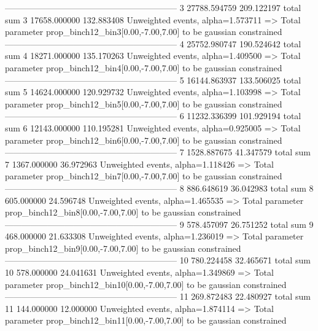 ------------------------------------------------------------
3          27788.594759    209.122197      total sum                     
3          17658.000000    132.883408      Unweighted events, alpha=1.573711
  => Total parameter prop_binch12_bin3[0.00,-7.00,7.00] to be gaussian constrained
------------------------------------------------------------
4          25752.980747    190.524642      total sum                     
4          18271.000000    135.170263      Unweighted events, alpha=1.409500
  => Total parameter prop_binch12_bin4[0.00,-7.00,7.00] to be gaussian constrained
------------------------------------------------------------
5          16144.863937    133.506025      total sum                     
5          14624.000000    120.929732      Unweighted events, alpha=1.103998
  => Total parameter prop_binch12_bin5[0.00,-7.00,7.00] to be gaussian constrained
------------------------------------------------------------
6          11232.336399    101.929194      total sum                     
6          12143.000000    110.195281      Unweighted events, alpha=0.925005
  => Total parameter prop_binch12_bin6[0.00,-7.00,7.00] to be gaussian constrained
------------------------------------------------------------
7          1528.887675     41.347579       total sum                     
7          1367.000000     36.972963       Unweighted events, alpha=1.118426
  => Total parameter prop_binch12_bin7[0.00,-7.00,7.00] to be gaussian constrained
------------------------------------------------------------
8          886.648619      36.042983       total sum                     
8          605.000000      24.596748       Unweighted events, alpha=1.465535
  => Total parameter prop_binch12_bin8[0.00,-7.00,7.00] to be gaussian constrained
------------------------------------------------------------
9          578.457097      26.751252       total sum                     
9          468.000000      21.633308       Unweighted events, alpha=1.236019
  => Total parameter prop_binch12_bin9[0.00,-7.00,7.00] to be gaussian constrained
------------------------------------------------------------
10         780.224458      32.465671       total sum                     
10         578.000000      24.041631       Unweighted events, alpha=1.349869
  => Total parameter prop_binch12_bin10[0.00,-7.00,7.00] to be gaussian constrained
------------------------------------------------------------
11         269.872483      22.480927       total sum                     
11         144.000000      12.000000       Unweighted events, alpha=1.874114
  => Total parameter prop_binch12_bin11[0.00,-7.00,7.00] to be gaussian constrained
